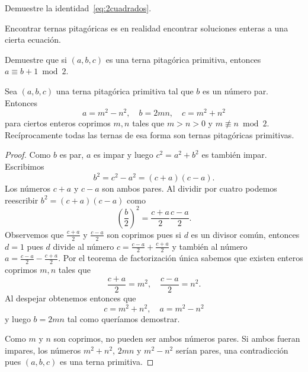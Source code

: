 \begin{exercise}
Demuestre la identidad~\eqref{eq:2cuadrados}. 
\end{exercise}


Encontrar ternas pitagóricas es en realidad
encontrar soluciones enteras a una cierta ecuación.  

\begin{exercise}
	\label{xca:paridad}
	Demuestre que si $(a,b,c)$ es una terna pitagórica primitiva, entonces $a\equiv b+1\bmod
	2$. 
\end{exercise}


\begin{theorem}
	\label{thm:ternas_pitagoricas}
	Sea $(a,b,c)$ una terna pitagórica primitiva tal que $b$ es un número par.
	Entonces 
	\[
		a=m^2-n^2,\quad
		b=2mn,\quad
		c=m^2+n^2
	\]
	para ciertos enteros coprimos $m,n$ tales que $m>n>0$ y $m\not\equiv n\bmod
	2$. Recíprocamente todas las ternas de esa forma son ternas pitagóricas
	primitivas. 
\end{theorem}

\begin{proof}
	Como $b$ es par, $a$ es impar y luego $c^2=a^2+b^2$ es también impar. Escribimos
	\[
		b^2=c^2-a^2=(c+a)(c-a). 
	\]
	Los números $c+a$ y $c-a$ son ambos pares. Al dividir por
	cuatro podemos reescribir $b^2=(c+a)(c-a)$ como 
	\[
		\left(\frac{b}{2}\right)^2=\frac{c+a}{2}\frac{c-a}{2}.
	\]
	Observemos que $\frac{c+a}{2}$ y $\frac{c-a}{2}$ son coprimos pues si $d$
	es un divisor común, entonces $d=1$ pues $d$ divide al número 
	$c=\frac{c-a}{2}+\frac{c+a}{2}$ y también al número 
	$a=\frac{c-a}{2}-\frac{c+a}{2}$. Por el teorema de factorización única
	sabemos que existen enteros coprimos $m,n$ tales que
	\[
		\frac{c+a}{2}=m^2,\quad
		\frac{c-a}{2}=n^2.
	\]
	Al despejar obtenemos entonces que 
	\[
		c=m^2+n^2,\quad
		a=m^2-n^2
	\]
	y luego $b=2mn$ tal como queríamos demostrar. 
	
	Como $m$ y $n$ son coprimos,
	no pueden ser ambos números pares. Si ambos fueran impares, los números
	$m^2+n^2$, $2mn$ y $m^2-n^2$ serían pares, una contradicción pues $(a,b,c)$
	es una terna primitiva.
\end{proof}

